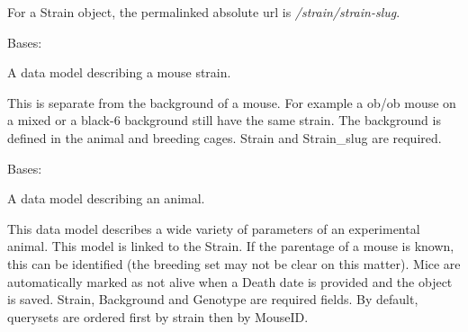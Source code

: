 \documentclass[letterpaper,10pt,english]{sphinxmanual}
\begin{document}
\begin{fulllineitems}
\begin{fulllineitems}
\label{api:mousedb.animal.models.Strain.get_absolute_url}
For a Strain object, the permalinked absolute url is \emph{/strain/strain-slug}.

\end{fulllineitems}



\begin{fulllineitems}
\label{api:mousedb.animal.models.Strain.study_set}
\end{fulllineitems}


\end{fulllineitems}



\begin{fulllineitems}
Bases: 

A data model describing a mouse strain.

This is separate from the background of a mouse.  For example a ob/ob mouse on a mixed or a black-6 background still have the same strain.  The background is defined in the animal and breeding cages.  Strain and Strain\_slug are required.

\end{fulllineitems}



\begin{fulllineitems}
Bases: 

A data model describing an animal.

This data model describes a wide variety of parameters of an experimental animal.  This model is linked to the Strain.  If the parentage of a mouse is known, this can be identified (the breeding set may not be clear on this matter). Mice are automatically marked as not alive when a Death date is provided and the object is saved.  Strain, Background and Genotype are required fields.  By default, querysets are ordered first by strain then by MouseID.

\end{fulllineitems}
\end{document}
